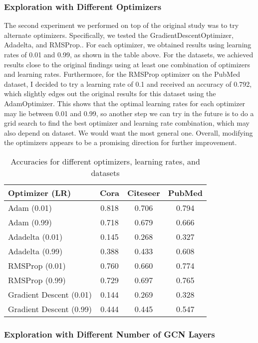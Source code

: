 \documentclass[11pt,a4paper]{article}
\begin{document}
\subsubsection{Exploration with Different Optimizers}

The second experiment we performed on top of the original study was to try alternate optimizers. Specifically, we tested the GradientDescentOptimizer, Adadelta, and RMSProp.. For each optimizer, we obtained results using learning rates of 0.01 and 0.99, as shown in the table above. For the datasets, we achieved results close to the original findings using at least one combination of optimizers and learning rates. Furthermore, for the RMSProp optimizer on the PubMed dataset, I decided to try a learning rate of 0.1 and received an accuracy of 0.792, which slightly edges out the original results for this dataset using the AdamOptimizer. This shows that the optimal learning rates for each optimizer may lie between 0.01 and 0.99, so another step we can try in the future is to do a grid search to find the best optimizer and learning rate combination, which may also depend on dataset. We would want the most general one. Overall, modifying the optimizers appears to be a promising direction for further improvement.

\begin{table}[h]
  \centering
  \begin{tabular}{p{2.3cm}|c|c|c}
  \textbf{Optimizer (LR)} & \textbf{Cora} & \textbf{Citeseer} & \textbf{PubMed} \\ \hline
  Adam (0.01)             & 0.818 & 0.706 & 0.794 \\
  Adam (0.99)             & 0.718 & 0.679 & 0.666 \\
  Adadelta (0.01)         & 0.145 & 0.268 & 0.327 \\
  Adadelta (0.99)         & 0.388 & 0.433 & 0.608 \\
  RMSProp (0.01)          & 0.760 & 0.660 & 0.774 \\
  RMSProp (0.99)          & 0.729 & 0.697 & 0.765 \\
  Gradient Descent (0.01) & 0.144 & 0.269 & 0.328 \\
  Gradient Descent (0.99) & 0.444 & 0.445 & 0.547
  \end{tabular}
  \caption{Accuracies for different optimizers, learning rates, and datasets}
  \label{table:optimizers}
\end{table}

\subsubsection{Exploration with Different Number of GCN Layers}
\end{document}
